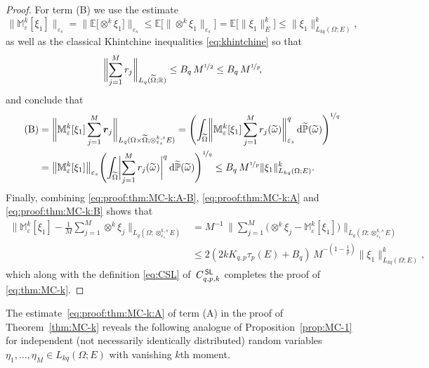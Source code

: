 \documentclass[reqno]{amsart}
\numberwithin{equation}{section}
\newcommand{\bbE}{\mathbb{E}}
\newcommand{\bbM}{\mathbb{M}}
\newcommand{\bbP}{\mathbb{P}}
\newcommand{\bbR}{\mathbb{R}}
\newcommand{\omegat}{\widetilde{\omega}}
\newcommand{\bbPt}{\widetilde{\bbP}}
\newcommand{\rvec}{\boldsymbol{r}}
\newcommand{\xk}{\otimes^k}
\newcommand{\xkseps}{\otimes^{k,s}_{\varepsilon_s}}
\newcommand{\Mk}{\bbM^k_\varepsilon}
\newcommand{\norm}[2]{     \| #1       \|_{ #2 }}
\newcommand{\rd}{\mathrm{d}}
\newcommand{\eps}{\varepsilon}
\newcommand{\CSL}{C^{\,\sf SL}_{q,p,k}}
\theoremstyle{remark}
\theoremstyle{definition}
\begin{document}
\begin{proof}
	For term (B) we use the estimate  
	\[
	\bigl\| \Mk[\xi_1] \bigr\|_{\eps_s}  
	= 
	\bigl\| \bbE\bigl[ \xk \xi_1 \bigr] \bigr\|_{\eps_s} 
	\leq 
	\bbE\bigl[ \norm{ {\xk} \xi_1 }{\eps_s} \bigr]
	= 
	\bbE\bigl[ \norm{ \xi_1 }{E}^k \bigr] 
	\leq 
	\norm{ \xi_1 }{L_{kq}(\Omega;E)}^k , 
	\]
	as well as the classical 
	Khintchine inequalities \eqref{eq:khintchine}
	so that 
	\[
	\biggl\| 
	\sum_{j=1}^M 
	r_j 
	\biggr\|_{L_q(\widetilde{\Omega};\bbR)} 
	\leq 
	B_q \, M^{\nicefrac{1}{2}} 
	\leq 
	B_q \, M^{\nicefrac{1}{p}} \!, 
	\]
	and conclude that 
	\begin{equation}\label{eq:proof:thm:MC-k:B}   
	\begin{split} 
	\text{(B)}  
	&= 
	\biggl\| 
	\Mk[\xi_1] 
	\sum_{j=1}^M 
	\rvec_j 
	\biggr\|_{L_q(\Omega\times\widetilde{\Omega};\xkseps E)}   
	= 
	\Biggl( 
	\int_{\widetilde{\Omega}} 
	\biggl\| 
	\Mk[\xi_1] 
	\sum_{j=1}^M 
	r_j (\omegat) 
	\biggr\|_{\eps_s}^q   
	\, \rd\bbPt(\omegat) 
	\Biggr)^{\nicefrac{1}{q}} 
	\\
	&=
	\bigl\| 
	\Mk[\xi_1]  
	\bigr\|_{\eps_s} 
	\Biggl( 
	\int_{\widetilde{\Omega}} 
	\biggl| 
	\sum_{j=1}^M 
	r_j(\widetilde{\omega}) 
	\biggr|^q 
	\, \rd\bbPt(\omegat) 
	\Biggr)^{\nicefrac{1}{q}} 
	\leq 
	B_q \, M^{\nicefrac{1}{p}} 
	\norm{ \xi_1 }{L_{kq}(\Omega; E)}^k . 
	\end{split} 
	\end{equation} 
	Finally, combining \eqref{eq:proof:thm:MC-k:A-B}, 
	\eqref{eq:proof:thm:MC-k:A} and 
	\eqref{eq:proof:thm:MC-k:B} shows that 
	\begin{align*} 
	\biggl\| 
	\Mk[\xi_1] 
	-
	\frac{1}{M} 
	\sum_{j=1}^M 
	\xk \xi_j 
	\biggr\|_{L_q(\Omega;\xkseps E)} 
	&=
	M^{-1} \, 
	\biggl\| 
	\sum_{j=1}^M 
	\bigl(\xk \xi_j -  \Mk[\xi_1] \bigr)
	\biggr\|_{L_q(\Omega;\xkseps E)} 
	\\
	&\leq 
	2 
	( 2k K_{q,p} \tau_p(E) + B_q) \, 
	M^{-\left(1-\frac{1}{p}\right)} 
	\norm{ \xi_1 }{L_{kq}(\Omega;E)}^k, 
	\end{align*} 
	which along with 
	the definition \eqref{eq:CSL} 
	of~$\CSL$ 
	completes the proof 
	of \eqref{eq:thm:MC-k}. 
\end{proof} 

The estimate~\eqref{eq:proof:thm:MC-k:A} 
of term (A) in the proof of Theorem~\ref{thm:MC-k} 
reveals the following analogue of 
Proposition~\ref{prop:MC-1} 
for independent (not necessarily identically distributed) random variables 
$\eta_1,\ldots,\eta_M\in L_{kq}(\Omega;E)$ 
with vanishing $k$th moment. 
	
\end{document}
